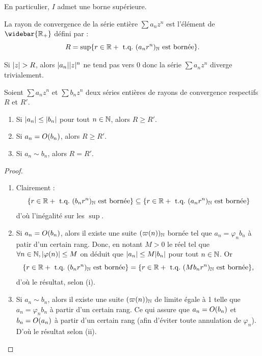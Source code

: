 \documentclass[french]{article}
\begin{document}
\begin{rmq}
En particulier, $I$ admet une borne supérieure.
\end{rmq}

\begin{defn}
La rayon de convergence de la série entière $\sum a_n z^n$ est l'élément de $\widebar{\Rp}$ défini par :
\[ R = \sup \{  r \in \mathbb{R}+ \text{~t.q.~} (a_n r^n)_{\mathbb{N}} \text{ est bornée}  \} . \]
\end{defn}

\begin{rmq}
Si $\lvert z\rvert > R$, alors $\lvert a_n\rvert\lvert z\rvert^n$ ne tend pas vers 0 donc la série $\sum a_n z^n$ diverge trivialement.
\end{rmq}

\begin{thm}
Soient $\sum a_n z^n$ et $\sum b_n z^n$ deux séries entières de rayons de convergence respectifs $R$ et $R'$.
\begin{enumerate}[label=(\roman)]
\item Si $\lvert a_n\rvert \leq \lvert b_n\rvert$ pour tout $n \in \mathbb{N}$, alors $R \geq R'$.
\item Si $a_n = O (b_n)$, alors $R \geq R'$.
\item Si $a_n \sim b_n$, alors $R = R'$.
\end{enumerate}
\end{thm}

\begin{proof}
\begin{enumerate}[label=(\roman)]
\item Clairement :
\[ \{  r \in \mathbb{R}+ \text{~t.q.~} (b_n r^n)_{\mathbb{N}} \text{ est bornée}  \} \subseteq \{  r \in \mathbb{R}+ \text{~t.q.~} (a_n r^n)_{\mathbb{N}} \text{ est bornée}  \} \]
d'où l'inégalité sur les $\sup$.  
\item Si $a_n = O (b_n)$, alors il existe une suite $(\varpi(n))_{\mathbb{N}}$ bornée tel que $a_n = \varphi_n b_n$ à patir d'un certain rang.
 Donc, en notant $M >0$ le réel tel que $\forall n \in \mathbb{N}, \lvert\varphi(n)\rvert \leq M$ on déduit que 
$\lvert a_n\rvert \leq M \lvert b_n\rvert$ pour tout $n \in \mathbb{N}$. Or
 \[ \{  r \in \mathbb{R}+ \text{~t.q.~} (b_n r^n)_{\mathbb{N}} \text{ est bornée}  \} = \{  r \in \mathbb{R}+ \text{~t.q.~} (M b_n r^n)_{\mathbb{N}} \text{ est bornée}  \} , \]
 d'où le résultat, selon (i).
\item Si $a_n \sim b_n$, alors il existe une suite $(\varpi(n))_{\mathbb{N}}$ de limite égale à 1 telle que $a_n = \varphi_n b_n$ à partir d'un 
certain rang. Ce qui assure que $a_n = O (b_n)$ et $b_n = O (a_n)$ à partir d'un certain rang (afin d'éviter toute annulation de 
$\varphi_n$). D'où le résultat selon (ii). 
\end{enumerate}
\end{proof}
\end{document}
